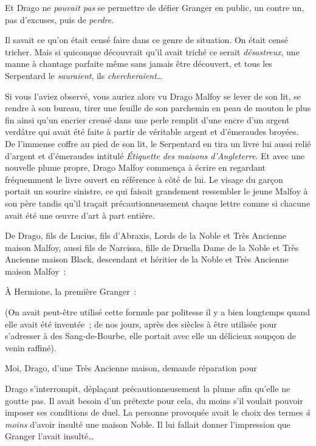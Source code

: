 Et Drago ne \emph{pouvait pas} se permettre de défier Granger en public, un contre un, pas d'excuses, puis de \emph{perdre}.

Il savait ce qu'on était censé faire dans ce genre de situation.
On était censé tricher.
Mais si quiconque découvrait qu'il avait triché ce serait \emph{désastreux}, une manne à chantage parfaite même sans jamais être découvert, et tous les Serpentard le \emph{sauraient}, ils \emph{chercheraient}…

Si vous l'aviez observé, vous auriez alors vu Drago Malfoy se lever de son lit, se rendre à son bureau, tirer une feuille de son parchemin en peau de mouton le plus fin ainsi qu'un encrier creusé dans une perle remplit d'une encre d'un argent verdâtre qui avait été faite à partir de véritable argent et d'émeraudes broyées.
De l'immense coffre au pied de son lit, le Serpentard en tira un livre lui aussi relié d'argent et d'émeraudes intitulé \emph{Étiquette des maisons d'Angleterre}.
Et avec une nouvelle plume propre, Drago Malfoy commença à écrire en regardant fréquemment le livre ouvert en référence à côté de lui.
Le visage du garçon portait un sourire sinistre, ce qui faisait grandement ressembler le jeune Malfoy à son père tandis qu'il traçait précautionneusement chaque lettre comme si chacune avait été une œuvre d'art à part entière.

\begin{writtenNote}
De Drago, fils de Lucius, fils d'Abraxis, Lords de la Noble et Très Ancienne maison Malfoy, aussi fils de Narcissa, fille de Druella Dame de la Noble et Très Ancienne maison Black, descendant et héritier de la Noble et Très Ancienne maison Malfoy~:

À Hermione, la première Granger~:
\end{writtenNote}

(On avait peut-être utilisé cette formule par politesse il y a bien longtemps quand elle avait été inventée~; de nos jours, après des siècles à être utilisée pour s'adresser à des Sang-de-Bourbe, elle portait avec elle un délicieux soupçon de venin raffiné).

\begin{writtenNote}
Moi, Drago, d'une Très Ancienne maison, demande réparation pour
\end{writtenNote}

Drago s'interrompit, déplaçant précautionneusement la plume afin qu'elle ne goutte pas.
Il avait besoin d'un prétexte pour cela, du moins s'il voulait pouvoir imposer ses conditions de duel.
La personne provoquée avait le choix des termes \emph{à moins} d'avoir insulté une maison Noble.
Il lui fallait donner l'impression que Granger l'avait insulté…

